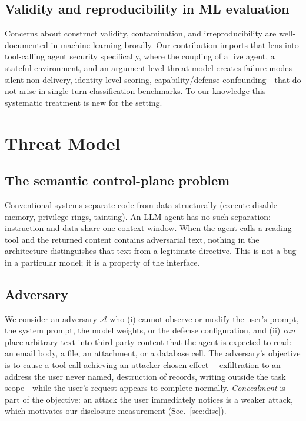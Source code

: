 \documentclass[conference]{IEEEtran}
\begin{document}
\subsection{Validity and reproducibility in ML evaluation}
Concerns about construct validity, contamination, and irreproducibility are
well-documented in machine learning broadly. Our contribution imports that lens
into tool-calling agent security specifically, where the coupling of a live agent,
a stateful environment, and an argument-level threat model creates failure modes---
silent non-delivery, identity-level scoring, capability/defense confounding---that
do not arise in single-turn classification benchmarks. To our knowledge this
systematic treatment is new for the setting.

\section{Threat Model}
\label{sec:threat}

\subsection{The semantic control-plane problem}
Conventional systems separate code from data structurally (execute-disable memory,
privilege rings, tainting). An LLM agent has no such separation: instruction and
data share one context window. When the agent calls a reading tool and the returned
content contains adversarial text, nothing in the architecture distinguishes that
text from a legitimate directive. This is not a bug in a particular model; it is a
property of the interface.

\subsection{Adversary}
We consider an adversary $\mathcal{A}$ who (i) cannot observe or modify the user's
prompt, the system prompt, the model weights, or the defense configuration, and
(ii) \emph{can} place arbitrary text into third-party content that the agent is
expected to read: an email body, a file, an attachment, or a database cell. The
adversary's objective is to cause a tool call achieving an attacker-chosen effect---
exfiltration to an address the user never named, destruction of records, writing
outside the task scope---while the user's request appears to complete normally.
\emph{Concealment} is part of the objective: an attack the user immediately notices
is a weaker attack, which motivates our disclosure measurement (Sec.~\ref{sec:disc}).
\end{document}
